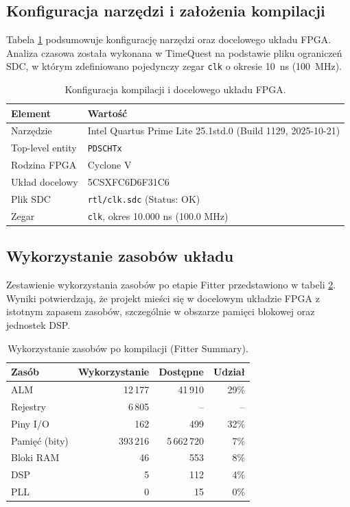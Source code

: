 \subsection{Konfiguracja narzędzi i założenia kompilacji}
\label{subsec:setup_quartus}

Tabela \ref{tab:impl_setup} podsumowuje konfigurację narzędzi oraz docelowego układu FPGA.
Analiza czasowa została wykonana w TimeQuest na podstawie pliku ograniczeń SDC,
w którym zdefiniowano pojedynczy zegar \texttt{clk} o okresie 10~ns (100~MHz).

\begin{table}[!ht]
\centering
\caption{Konfiguracja kompilacji i docelowego układu FPGA.}
\label{tab:impl_setup}
\begin{tabular}{ll}
\hline
Element & Wartość \\
\hline
Narzędzie & Intel Quartus Prime Lite 25.1std.0 (Build 1129, 2025-10-21) \\
Top-level entity & \texttt{PDSCHTx} \\
Rodzina FPGA & Cyclone V \\
Układ docelowy & 5CSXFC6D6F31C6 \\
Plik SDC & \texttt{rtl/clk.sdc} (Status: OK) \\
Zegar & \texttt{clk}, okres 10.000 ns (100.0 MHz) \\
\hline
\end{tabular}
\end{table}

\subsection{Wykorzystanie zasobów układu}
\label{subsec:resource_usage}

Zestawienie wykorzystania zasobów po etapie Fitter przedstawiono w tabeli \ref{tab:resource_usage}.
Wyniki potwierdzają, że projekt mieści się w docelowym układzie FPGA z istotnym zapasem zasobów,
szczególnie w obszarze pamięci blokowej oraz jednostek DSP.

\begin{table}[!ht]
\centering
\caption{Wykorzystanie zasobów po kompilacji (Fitter Summary).}
\label{tab:resource_usage}
\begin{tabular}{lrrr}
\hline
Zasób & Wykorzystanie & Dostępne & Udział \\
\hline
ALM & 12\,177 & 41\,910 & 29\% \\
Rejestry & 6\,805 & -- & -- \\
Piny I/O & 162 & 499 & 32\% \\
Pamięć (bity) & 393\,216 & 5\,662\,720 & 7\% \\
Bloki RAM & 46 & 553 & 8\% \\
DSP & 5 & 112 & 4\% \\
PLL & 0 & 15 & 0\% \\
\hline
\end{tabular}
\end{table}

